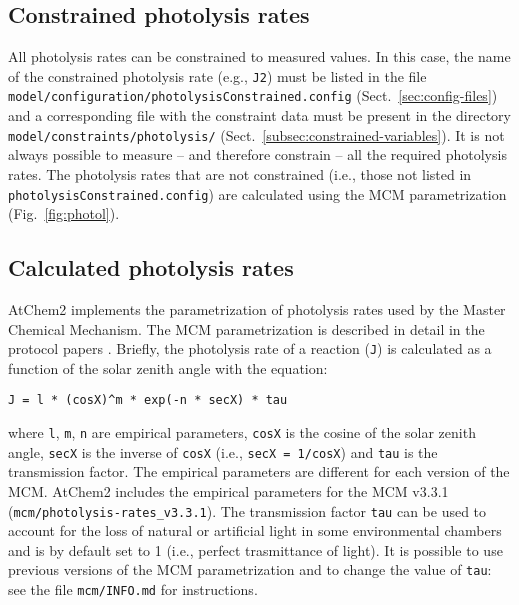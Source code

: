 \subsection{Constrained photolysis rates} \label{subsec:constrained-photolysis-rates}

All photolysis rates can be constrained to measured values. In this
case, the name of the constrained photolysis rate (e.g., \texttt{J2})
must be listed in the file
\texttt{model/configuration/photolysisConstrained.config}
(Sect.~\ref{sec:config-files}) and a corresponding file with the
constraint data must be present in the directory
\texttt{model/constraints/photolysis/}
(Sect.~\ref{subsec:constrained-variables}). It is not always possible
to measure -- and therefore constrain -- all the required photolysis
rates. The photolysis rates that are not constrained (i.e., those not
listed in \texttt{photolysisConstrained.config}) are calculated using
the MCM parametrization (Fig.~\ref{fig:photol}).

\subsection{Calculated photolysis rates} \label{subsec:calculated-photolysis-rates}

AtChem2 implements the parametrization of photolysis rates used by the
Master Chemical Mechanism. The MCM parametrization is described in
detail in the protocol papers \citep{jenkin_1997, saunders_2003}.
Briefly, the photolysis rate of a reaction (\texttt{J}) is calculated
as a function of the solar zenith angle with the equation:

\begin{verbatim}
J = l * (cosX)^m * exp(-n * secX) * tau
\end{verbatim}

where \texttt{l}, \texttt{m}, \texttt{n} are empirical parameters,
\texttt{cosX} is the cosine of the solar zenith angle, \texttt{secX}
is the inverse of \texttt{cosX} (i.e., \texttt{secX\ =\ 1/cosX}) and
\texttt{tau} is the transmission factor. The empirical parameters are
different for each version of the MCM. AtChem2 includes the empirical
parameters for the MCM v3.3.1 (\texttt{mcm/photolysis-rates\_v3.3.1}).
The transmission factor \texttt{tau} can be used to account for the
loss of natural or artificial light in some environmental chambers and
is by default set to 1 (i.e., perfect trasmittance of light). It is
possible to use previous versions of the MCM parametrization and to
change the value of \texttt{tau}: see the file \texttt{mcm/INFO.md}
for instructions.

